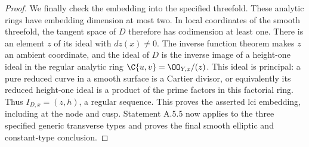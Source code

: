 \begin{proof}
We finally check the embedding into the specified
threefold. These analytic rings have embedding
dimension at most two. In local coordinates of the
smooth threefold, the tangent space of $D$ therefore
has codimension at least one. There is an element
$z$ of its ideal with $dz(x)\ne0$. The inverse
function theorem makes $z$ an ambient coordinate,
and the ideal of $D$ is the inverse image of a
height-one ideal in the regular analytic ring
$\C\{u,v\}=\OO_{Y,x}/(z)$. This ideal is principal:
a pure reduced curve in a smooth surface is a Cartier
divisor, or equivalently its reduced height-one ideal
is a product of the prime factors in this factorial
ring. Thus $I_{D,x}=(z,h)$, a regular sequence.
This proves the asserted lci embedding, including
at the node and cusp. Statement A.5.5 now applies
to the three specified generic transverse types
and proves the final smooth elliptic and constant-type
conclusion.
\end{proof}






